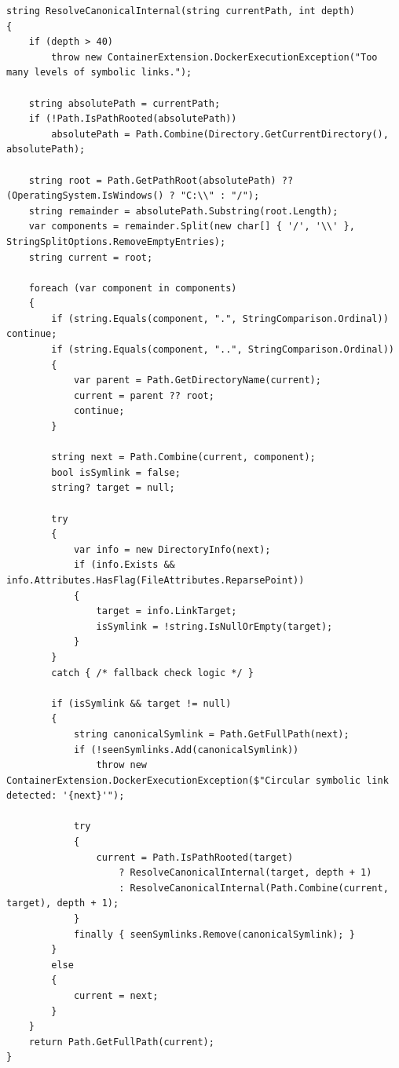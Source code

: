 \begin{lstlisting}[language=CSharp, caption={Recursive Symbolic Link Resolution (ResolveCanonicalInternal, condensed)}, label={lst:resolve_canonical_internal}]
string ResolveCanonicalInternal(string currentPath, int depth)
{
    if (depth > 40)
        throw new ContainerExtension.DockerExecutionException("Too many levels of symbolic links.");

    string absolutePath = currentPath;
    if (!Path.IsPathRooted(absolutePath))
        absolutePath = Path.Combine(Directory.GetCurrentDirectory(), absolutePath);

    string root = Path.GetPathRoot(absolutePath) ?? (OperatingSystem.IsWindows() ? "C:\\" : "/");
    string remainder = absolutePath.Substring(root.Length);
    var components = remainder.Split(new char[] { '/', '\\' }, StringSplitOptions.RemoveEmptyEntries);
    string current = root;

    foreach (var component in components)
    {
        if (string.Equals(component, ".", StringComparison.Ordinal)) continue;
        if (string.Equals(component, "..", StringComparison.Ordinal))
        {
            var parent = Path.GetDirectoryName(current);
            current = parent ?? root;
            continue;
        }

        string next = Path.Combine(current, component);
        bool isSymlink = false;
        string? target = null;

        try
        {
            var info = new DirectoryInfo(next);
            if (info.Exists && info.Attributes.HasFlag(FileAttributes.ReparsePoint))
            {
                target = info.LinkTarget;
                isSymlink = !string.IsNullOrEmpty(target);
            }
        }
        catch { /* fallback check logic */ }

        if (isSymlink && target != null)
        {
            string canonicalSymlink = Path.GetFullPath(next);
            if (!seenSymlinks.Add(canonicalSymlink))
                throw new ContainerExtension.DockerExecutionException($"Circular symbolic link detected: '{next}'");

            try
            {
                current = Path.IsPathRooted(target) 
                    ? ResolveCanonicalInternal(target, depth + 1)
                    : ResolveCanonicalInternal(Path.Combine(current, target), depth + 1);
            }
            finally { seenSymlinks.Remove(canonicalSymlink); }
        }
        else
        {
            current = next;
        }
    }
    return Path.GetFullPath(current);
}
\end{lstlisting}

